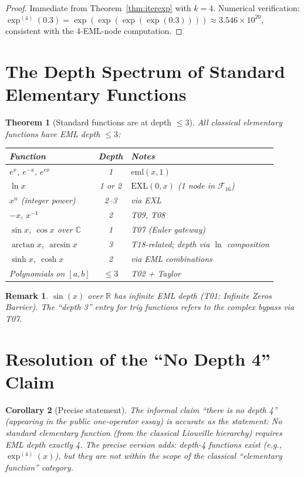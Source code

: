 \documentclass[11pt]{article}
\newtheorem{theorem}{Theorem}
\newtheorem{corollary}[theorem]{Corollary}
\newtheorem{remark}{Remark}
\begin{document}
\begin{proof}
Immediate from Theorem~\ref{thm:iterexp} with $k = 4$.  Numerical verification:
$\exp^{(4)}(0.3) = \exp(\exp(\exp(\exp(0.3)))) \approx 3.546 \times 10^{20}$,
consistent with the 4-EML-node computation.
\end{proof}

\section{The Depth Spectrum of Standard Elementary Functions}

\begin{theorem}[Standard functions are at depth $\leq 3$]\label{thm:depth3}
All classical elementary functions have EML depth $\leq 3$:
\begin{center}
\begin{tabular}{lcl}
\hline
Function & Depth & Notes \\
\hline
$e^x$, $e^{-x}$, $e^{cx}$ & 1 & $\mathrm{eml}(x,1)$ \\
$\ln x$                     & 1 or 2 & $\mathrm{EXL}(0,x)$ (1 node in $\mathcal{F}_{16}$) \\
$x^n$ (integer power)       & 2--3 & via EXL \\
$-x$, $x^{-1}$             & 2 & T09, T08 \\
$\sin x$, $\cos x$ over $\mathbb{C}$ & 1 & T07 (Euler gateway) \\
$\arctan x$, $\arcsin x$   & 3 & T18-related; depth via $\ln$ composition \\
$\sinh x$, $\cosh x$        & 2 & via EML combinations \\
Polynomials on $[a,b]$       & $\leq 3$ & T02 + Taylor \\
\hline
\end{tabular}
\end{center}
\end{theorem}

\begin{remark}
$\sin(x)$ over $\mathbb{R}$ has infinite EML depth (T01: Infinite Zeros Barrier).
The ``depth 3'' entry for trig functions refers to the complex bypass via T07.
\end{remark}

\section{Resolution of the ``No Depth 4'' Claim}

\begin{corollary}[Precise statement]
The informal claim ``there is no depth 4'' (appearing in the public one-operator
essay) is accurate as the statement:
\emph{No standard elementary function (from the classical Liouville hierarchy)
requires EML depth exactly 4.}
The precise version adds: \emph{depth-4 functions exist} (e.g., $\exp^{(4)}(x)$),
but they are not within the scope of the classical ``elementary function'' category.
\end{corollary}
\end{document}

